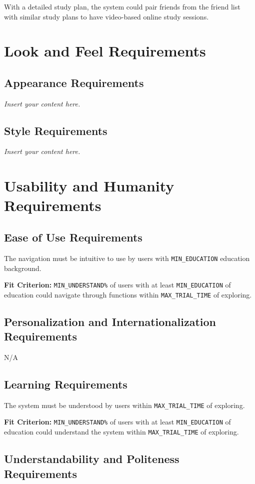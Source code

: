 \documentclass[12pt]{article}
\newcommand{\lips}{\textit{Insert your content here.}}
\begin{document}
\subsubsection{}
With a detailed study plan, the system could pair friends from the friend list with similar study plans to have video-based online study sessions.

\section{Look and Feel Requirements}
\subsection{Appearance Requirements}
\lips
\subsection{Style Requirements}
\lips

\section{Usability and Humanity Requirements}
\subsection{Ease of Use Requirements}
The navigation must be intuitive to use by users with \texttt{MIN\_EDUCATION} education background.

\textbf{Fit Criterion:} \texttt{MIN\_UNDERSTAND\%} of users with at least \texttt{MIN\_EDUCATION} of education could navigate through functions within \texttt{MAX\_TRIAL\_TIME} of exploring.

\subsection{Personalization and Internationalization Requirements}
N/A
\subsection{Learning Requirements}
The system must be understood by users within \texttt{MAX\_TRIAL\_TIME} of exploring.

\textbf{Fit Criterion:} \texttt{MIN\_UNDERSTAND\%} of users with at least \texttt{MIN\_EDUCATION} of education could understand the system within \texttt{MAX\_TRIAL\_TIME} of exploring.
\subsection{Understandability and Politeness Requirements}
\end{document}
